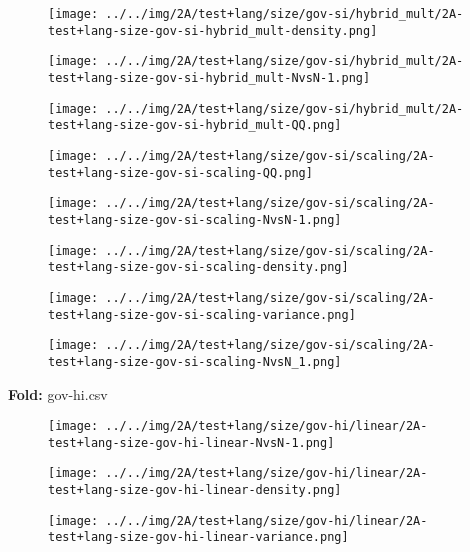 \begin{figure}[H]
\centering	\texttt{[image: ../../img/2A/test+lang/size/gov-si/hybrid\_mult/2A-test+lang-size-gov-si-hybrid\_mult-density.png]}
\end{figure}
\begin{figure}[H]
\centering	\texttt{[image: ../../img/2A/test+lang/size/gov-si/hybrid\_mult/2A-test+lang-size-gov-si-hybrid\_mult-NvsN-1.png]}
\end{figure}
\begin{figure}[H]
\centering	\texttt{[image: ../../img/2A/test+lang/size/gov-si/hybrid\_mult/2A-test+lang-size-gov-si-hybrid\_mult-QQ.png]}
\end{figure}
\begin{figure}[H]
\centering	\texttt{[image: ../../img/2A/test+lang/size/gov-si/scaling/2A-test+lang-size-gov-si-scaling-QQ.png]}
\end{figure}
\begin{figure}[H]
\centering	\texttt{[image: ../../img/2A/test+lang/size/gov-si/scaling/2A-test+lang-size-gov-si-scaling-NvsN-1.png]}
\end{figure}
\begin{figure}[H]
\centering	\texttt{[image: ../../img/2A/test+lang/size/gov-si/scaling/2A-test+lang-size-gov-si-scaling-density.png]}
\end{figure}
\begin{figure}[H]
\centering	\texttt{[image: ../../img/2A/test+lang/size/gov-si/scaling/2A-test+lang-size-gov-si-scaling-variance.png]}
\end{figure}
\begin{figure}[H]
\centering	\texttt{[image: ../../img/2A/test+lang/size/gov-si/scaling/2A-test+lang-size-gov-si-scaling-NvsN\_1.png]}
\end{figure}
\textbf{Fold:} gov-hi.csv
\begin{figure}[H]
\centering	\texttt{[image: ../../img/2A/test+lang/size/gov-hi/linear/2A-test+lang-size-gov-hi-linear-NvsN-1.png]}
\end{figure}
\begin{figure}[H]
\centering	\texttt{[image: ../../img/2A/test+lang/size/gov-hi/linear/2A-test+lang-size-gov-hi-linear-density.png]}
\end{figure}
\begin{figure}[H]
\centering	\texttt{[image: ../../img/2A/test+lang/size/gov-hi/linear/2A-test+lang-size-gov-hi-linear-variance.png]}
\end{figure}

